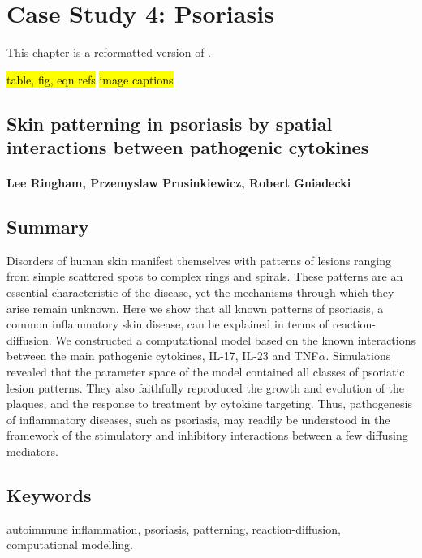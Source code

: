 \chapter{Case Study 4: Psoriasis}

This chapter is a reformatted version of \citep{ringham2019}.

\hl{table, fig, eqn refs}
\hl{image captions}

\section*{Skin patterning in psoriasis by spatial interactions between pathogenic cytokines}
\subsubsection*{Lee Ringham, Przemyslaw Prusinkiewicz, Robert Gniadecki}

\section{Summary} 
Disorders of human skin manifest themselves with patterns of lesions ranging from simple scattered spots to complex rings and spirals. These patterns are an essential characteristic of the disease, yet the mechanisms through which they arise remain unknown. Here we show that all known patterns of psoriasis, a common inflammatory skin disease, can be explained in terms of reaction-diffusion. We constructed a computational model based on the known interactions between the main pathogenic cytokines, IL-17, IL-23 and TNF$\alpha$. Simulations revealed that the parameter space of the model contained all classes of psoriatic lesion patterns. They also faithfully reproduced the growth and evolution of the plaques, and the response to treatment by cytokine targeting. Thus, pathogenesis of inflammatory diseases, such as psoriasis, may readily be understood in the framework of the stimulatory and inhibitory interactions between a few diffusing mediators.

\section{Keywords}
autoimmune inflammation, psoriasis, patterning, reaction-diffusion, computational modelling.

